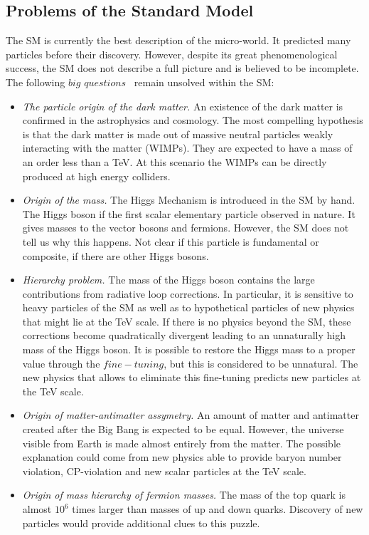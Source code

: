 \subsection{Problems of the Standard Model}

The SM is currently the best description of the micro-world. It predicted many particles before their discovery. However, despite its great phenomenological success, the SM does not describe a full picture and is believed to be incomplete. The following $big$ $questions$~\cite{Gershtein:2013iqa} remain unsolved within the SM:
\begin{itemize}
\item \textit{The particle origin of the dark matter.} An existence of the dark matter is confirmed in the astrophysics and cosmology. The most compelling hypothesis is that the dark matter is made out of massive neutral particles weakly interacting with the matter (WIMPs). They are expected to have a mass of an order less than a TeV. At this scenario the WIMPs can be directly produced at high energy colliders.
\item \textit{Origin of the mass.} The Higgs Mechanism is introduced in the SM by hand. The Higgs boson if the first scalar elementary particle observed in nature. It gives masses to the vector bosons and fermions. However, the SM does not tell us why this happens. Not clear if this particle is fundamental or composite, if there are other Higgs bosons.
\item \textit{Hierarchy problem.} The mass of the Higgs boson contains the large contributions from radiative loop corrections. In particular, it is sensitive to heavy particles of the SM as well as to hypothetical particles of new physics that might lie at the TeV scale. If there is no physics beyond the SM, these corrections become quadratically divergent leading to an unnaturally high mass of the Higgs boson. It is possible to restore the Higgs mass to a proper value through the $fine-tuning$, but this is considered to be unnatural. The new physics that allows to eliminate this fine-tuning predicts new particles at the TeV scale.
\item \textit{Origin of matter-antimatter assymetry.} An amount of matter and antimatter created after the Big Bang is expected to be equal. However, the universe visible from Earth is made almost entirely from the matter.
The possible explanation could come from new physics able to provide baryon number violation, CP-violation and new scalar particles at the TeV scale.
\item \textit{Origin of mass hierarchy of fermion masses.} The mass of the top quark is almost $10^6$ times larger than masses of up and down quarks. Discovery of new particles would provide additional clues to this puzzle.

\end{itemize}
